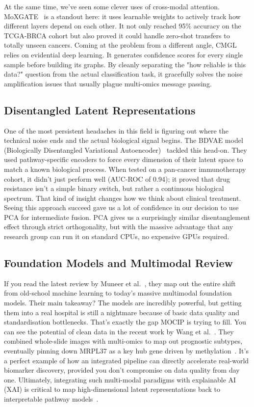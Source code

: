 \documentclass[12pt,a4paper,onecolumn]{article}
\begin{document}
At the same time, we've seen some clever uses of cross-modal attention. MoXGATE~\cite{dip2025moxgate} is a standout here: it uses learnable weights to actively track how different layers depend on each other. It not only reached 95\% accuracy on the TCGA-BRCA cohort but also proved it could handle zero-shot transfers to totally unseen cancers. Coming at the problem from a different angle, CMGL~\cite{fan2026cmgl} relies on evidential deep learning. It generates confidence scores for every single sample before building its graphs. By cleanly separating the "how reliable is this data?" question from the actual classification task, it gracefully solves the noise amplification issues that usually plague multi-omics message passing.

\subsection{Disentangled Latent Representations}
One of the most persistent headaches in this field is figuring out where the technical noise ends and the actual biological signal begins. The BDVAE model (Biologically Disentangled Variational Autoencoder)~\cite{tariq2025bdvae} tackled this head-on. They used pathway-specific encoders to force every dimension of their latent space to match a known biological process. When tested on a pan-cancer immunotherapy cohort, it didn't just perform well (AUC-ROC of 0.94); it proved that drug resistance isn't a simple binary switch, but rather a continuous biological spectrum. That kind of insight changes how we think about clinical treatment. Seeing this approach succeed gave us a lot of confidence in our decision to use PCA for intermediate fusion. PCA gives us a surprisingly similar disentanglement effect through strict orthogonality, but with the massive advantage that any research group can run it on standard CPUs, no expensive GPUs required.

\subsection{Foundation Models and Multimodal Review}
If you read the latest review by Muneer et al.~\cite{muneer2025review}, they map out the entire shift from old-school machine learning to today's massive multimodal foundation models. Their main takeaway? The models are incredibly powerful, but getting them into a real hospital is still a nightmare because of basic data quality and standardisation bottlenecks. That's exactly the gap MOCIP is trying to fill. You can see the potential of clean data in the recent work by Wang et al.~\cite{wang2025deeppathomic}. They combined whole-slide images with multi-omics to map out prognostic subtypes, eventually pinning down MRPL37 as a key hub gene driven by methylation~\cite{wang2025deeppathomic}. It's a perfect example of how an integrated pipeline can directly accelerate real-world biomarker discovery, provided you don't compromise on data quality from day one. Ultimately, integrating such multi-modal paradigms with explainable AI (XAI) is critical to map high-dimensional latent representations back to interpretable pathway models~\cite{li2024explainable}.
\end{document}
